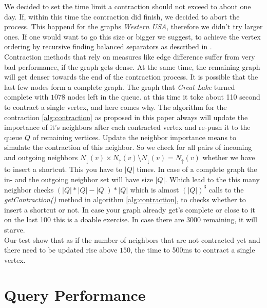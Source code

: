 We decided to set the time limit a contraction should not exceed to about one day. If, within this time the contraction did finish, we decided to abort the process. This happend for the graphs \textit{Western USA}, therefore we didn't try larger ones. If one would want to go this size or bigger we suggest,
to achieve the vertex ordering by recursive finding balanced separators as described in \cite[Customization Contraction Hierarchies]{CCH}. 
\\
Contraction methods that rely on measures like edge difference suffer from very bad performance, if the graph gets dense. At the same time, the remaining graph will get denser towards the end of the contraction process. It is possible  that the last few nodes form a complete graph. The graph that \textit{Great Lake} turned complete with $1078$ nodes left in the queue. 
at this time it toke about 110 second to contract a single vertex, and here comes why. The algorithm for the contraction \ref{alg:contraction}
as proposed in this paper always will update the importance  of it's neighbors  after each contracted vertex and re-push it to the queue $Q$ of remaining vertices. Update the neighbor importance means to simulate the contraction of this neighbor. So we check for all pairs of incoming and outgoing neighbors $N_\downarrow(v) \times N_\uparrow(v) \setminus N_\downarrow(v) = N_\uparrow(v)$ whether we have to insert a shortcut. 
This you have to $|Q|$ times. In case of a complete graph the in- and the outgoing neighbor set will have size $|Q|$. Which lead to the this many neighbor checks $(|Q| * |Q| - |Q|)*|Q|$ which is almost $(|Q|)^3$ calls to the \textit{getContraction()} method in algorithm \ref{alg:contraction}, to checks whether to insert a shortcut or not. In case your graph already get's complete or close to it on the last 
100 this is a doable exercise. In case there are 3000 remaining, it will starve. 
\\
Our test show that as if the number of neighbors that are not contracted yet and there need to be updated rise above $150$, the time to 500ms to contract a single vertex.


\section{Query Performance}




